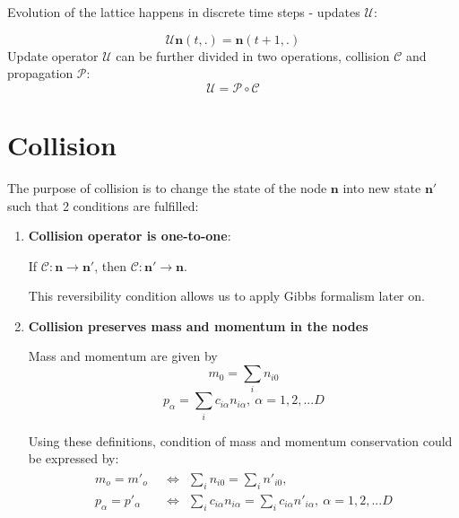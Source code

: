Evolution of the lattice happens in discrete time steps - updates $\mathcal{U}$:

\begin{equation}
\mathcal{U} \bm{n}(t,.) = \bm{n}(t+1,.)
\end{equation} 
Update operator $\mathcal{U}$ can be further divided in two operations, collision $\mathcal{C}$ and propagation $\mathcal{P}$:
\begin{equation}
\mathcal{U} = \mathcal{P} \circ \mathcal{C}
\end{equation} 

\section{Collision}

The purpose of collision is to change the state of the node $\bm{n}$ into new state $\bm{n'}$ such that 2 conditions are fulfilled:

\begin{enumerate}
\item \textbf{Collision operator is one-to-one}:

If $\mathcal{C}: \bm{n} \rightarrow \bm{n'}$,
then $\mathcal{C}: \bm{n'} \rightarrow \bm{n}$.

This reversibility condition allows us to apply Gibbs formalism later on.

\item \textbf{Collision preserves mass and momentum in the nodes}

Mass and momentum are given by
\begin{equation}
m_0 = \sum_i n_{i0}
\end{equation}
\begin{equation}
p_{\alpha} = \sum_i c_{i\alpha} n_{i\alpha},~\alpha=1,2,...D
\end{equation}

Using these definitions, condition of mass and momentum conservation could be expressed by:
\begin{align}\label{mmc}
\begin{split} 
m_o = m'_o &~~ \Leftrightarrow ~~ \sum_i n_{i0} = \sum_i n'_{i0}, \\
p_{\alpha} = p'_{\alpha} &~~ \Leftrightarrow ~~ \sum_i c_{i\alpha} n_{i\alpha} = \sum_i c_{i\alpha} n'_{i\alpha}, ~\alpha=1,2,... D 
\end{split}
\end{align}
\end{enumerate}


